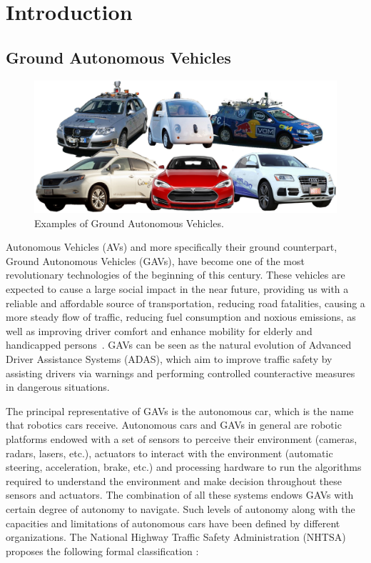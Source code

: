 \graphicspath{{./main/2_introduction/figures/}}

\chapter{Introduction}
\label{chap:intro}

\vspace{-10mm}
\section{Ground Autonomous Vehicles}
\begin{figure}[H]
	\centering
	\includegraphics[width=1\textwidth]{driverless2.eps}
	\caption{Examples of Ground Autonomous Vehicles.}
	\label{fig:00_driverless}
\end{figure}

Autonomous Vehicles (AVs) and more specifically their ground counterpart, Ground Autonomous Vehicles (GAVs), have become one of the most revolutionary technologies of the beginning of this century. These vehicles are expected to cause a large social impact in the near future, providing us with a reliable and affordable source of transportation, reducing road fatalities, causing a more steady flow of traffic, reducing fuel consumption and noxious emissions, as well as improving driver comfort and enhance mobility for elderly and handicapped persons~\cite{Woensel:2015}. GAVs can be seen as the natural evolution of Advanced Driver Assistance Systems (ADAS), which aim to improve traffic safety by assisting drivers via warnings and performing controlled counteractive measures in dangerous situations. 

The principal representative of GAVs is the autonomous car, which is the name that robotics cars receive. Autonomous cars and GAVs in general are  robotic platforms endowed with a set of sensors to perceive their environment (\eg cameras, radars, lasers, etc.), actuators to interact with the environment (\eg automatic steering, acceleration, brake, etc.) and processing hardware to run the algorithms required to understand the environment and make decision throughout these sensors and actuators. The combination of all these systems endows GAVs with certain degree of autonomy to navigate. Such levels of autonomy along with the capacities and limitations of autonomous cars have been defined by different organizations. The National Highway Traffic Safety Administration (NHTSA) proposes the following formal classification \cite{wiki:AutonomousCar}:

